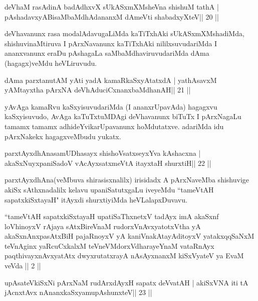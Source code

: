 \begin{shl}
deVhaM rasAdinA badAdhxvX sUkASxmXMsheVna shishuM tathA |
pAshadavxyABisaMbaMdhAdananxM dAmeVti shabadxyXteV\hfill || 20 ||
\end{shl}

\begin{artha}
deVhavanunx rasa modalAdavugaLiMda kaTiTxhAki sUkASxmXMshadiMda, shishuvinaMtiruva I pArxNavanunx kaTiTxhAki nililxsuvudariMda I ananxvanunx eraDu pAshagaLa saMbaMdhaviruvudariMda dAma (hagagx)veMdu heVLiruvudu.
\end{artha}

\begin{shl}
dAma parxtanutAM yAti yadA kamaRkaSxyAtatxdA |
yathAsavxM yAMtayxtha pArxNA deVhAduciCxnanxbaMdhanAH\hfill || 21 ||
\end{shl}

\begin{artha}
yAvAga kamaRvu kaSxyisuvudariMda (I ananxrUpavAda) hagagxvu kaSxyisuvudo, AvAga kaTuTxtuMDAgi deVhavanunx biTuTx I pArxNagaLu tamamx tamamx adhideYvikarUpavanunx hoMdutatxve. adariMda idu pArxNakekx hagagxveMbudu yukatx.
\end{artha}

\begin{shl}
parxtAyxdhAnasamUDhasayx shishoVsatxseyxYva kAshacxna |
akaSxNuyxpaniSadoV vAcAyxsatxmeVtA itayxtaH shurxtiH\hfill || 22 ||
\end{shl}

\begin{artha}
parxtAyxdhAna(veMbuva shirasisxnalilx) irisidadx A pArxNaveMba shishuvige akiSx sAthxnadalilx kelavu upaniSatutxgaLu iveyeMdu ``tameVtAH sapatxkiSxtayaH" itAyxdi shurxtiyiMda heVLalapxDuvavu.
\end{artha}


{}

\begin{kandikeshl}
``tameVtAH sapatxkiSxtayaH upatiSaThxnetxV tadAyx imA akaSxnf
loVhinoyxV rAjaya sAtxBireVnaM rudorxV\s nAvxyatotxV\s tha yA
akaSxnAnxpasAtxBiH pajaRnoyxV yA kaniVnakAtayA\s ditoyxV
yatakxqqSaNxM teVnAginx yaRcuCxkalxM teVneVMdorxV\s dharayeYnaM
vataRnAyx paqthivayxnAvxyatAtx dwyxrutatxrayA nAsAyxnanxM
kiSxVyateV ya EvaM veVda || 2 || 
\end{kandikeshl}


\begin{shl}
upAsateV\s kiSxNi pArxNaM rudArxdAyxH sapatx deVvatAH |
akiSxVNA iti tA jAcnxtAvx nAnanxkaSxyamupAshunxteV\hfill || 23 ||
\end{shl}

